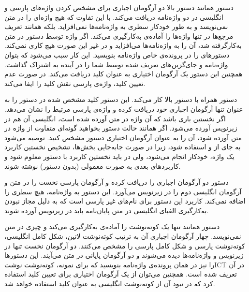 	 دستور  همانند دستور بالا دو آرگومان اجباری برای مشخص کردن واژه‌های پارسی و انگلیسی در دو واژه‌نامه دریافت می‌کند. با این تفاوت که هیچ واژه‌ای را در متن نمی‌نویسد و به طور خودکار سطری به واژه‌نامه‌ها نمی‌افزاید. بلکه همانند تعریف مرجع‌ها در  تنها واژه‌ها را آماده‌ی به‌کارگیری می‌کند. اگر واژه توسط دستور  در متن به‌کارگرفته شد، آن را به واژه‌نامه‌ها می‌افزاید و در غیر این صورت هیچ کاری نمی‌کند. دستورهای  را در پرونده‌ی خاص واژه‌نامه بنویسید. این کار سبب می‌شود که بتوان واژه‌نامه و جای‌گزین‌های تعریف شده توسط شما را در آینده به اشتراک گذاشت. همچنین این دستور یک آرگومان اختیاری به عنوان کلید دریافت می‌کند. در صورت عدم تعیین کلید، واژه‌ی پارسی نقش کلید را ایفا می‌کند.
	
	 دستور  همراه با دستور بالا کار می‌کند. این دستور کلید مشخص شده در دستور  را به عنوان تنها آرگومان اجباری خود دریافت کرده و واژه‌ی پارسی مرتبط را نشان می‌دهد. اگر نخستین باری باشد که آن واژه در متن آورده شده است، انگلیسی آن هم در زیرنویس آورده می‌شود. اگر همانند حالت دستور  بخواهید گونه‌ای متفاوت از واژه در متن آورده شود، آن را به عنوان آرگومان اختیاری دستور  مشخص کنید. توصیه می‌شود به جای  از  و  استفاده شود، زیرا در صورت جابه‌جایی بخش‌ها، تشخیص نخستین کاربرد یک واژه، خودکار انجام می‌شود، ولی در  باید نخستین کاربرد با دستور  معلوم شود و کاربردهای بعدی به صورت معمولی (بدون دستور) نوشته شوند.
	
	 دستور  دو آرگومان اجباری را دریافت کرده و آرگومان پارسی نخست را در متن و آرگومان انگلیسی دوم را در زیرنویس  می‌آورد. این دستور به واژه‌نامه، هیچ سطری را اضافه نمی‌کند. کاربرد این دستور برای نام‌های غیر پارسی است که به دلیل مجاز نبودن به‌کارگیری الفبای انگلیسی در متن پایان‌نامه باید در زیرنویس آورده شوند.
	
	 دستور  همانند  تنها یک کوته‌نوشت را آماده‌ی به‌کارگیری می‌کند و چیزی در متن نمی‌نویسد. چهار آرگومان اجباری آن به ترتیب کوته‌نوشت لاتین، شکل کامل انگلیسی، کوته‌نوشت پارسی و شکل کامل پارسی را مشخص می‌کنند. دو آرگومان نخست تنها در زیرنویس و واژه‌نامه‌ها دیده می‌شوند و دو آرگومان پایانی در متن می‌آیند. این دستورها را نیز در همان پرونده‌ی واژه‌نامه بنویسید که برای نمونه، کوته‌نوشت ‌نوشت{ICT} در آن تعریف شده است. همچنین می‌توان از یک آرگومان اختیاری برای تعیین کلید استفاده کرد که در نبود آن از کوته‌نوشت انگلیسی به عنوان کلید استفاده خواهد شد.
	
